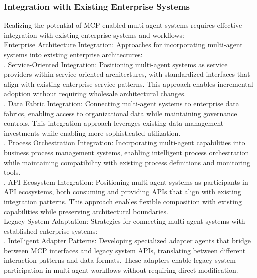 \subsubsection{Integration with Existing Enterprise Systems}
Realizing the potential of MCP-enabled multi-agent systems requires effective integration with existing enterprise systems and workflows:\\ \newline
Enterprise Architecture Integration: Approaches for incorporating multi-agent systems into existing enterprise architectures:\\ . Service-Oriented Integration: Positioning multi-agent systems as service providers within service-oriented architectures, with standardized interfaces that align with existing enterprise service patterns. This approach enables incremental adoption without requiring wholesale architectural changes.\\ . Data Fabric Integration: Connecting multi-agent systems to enterprise data fabrics, enabling access to organizational data while maintaining governance controls. This integration approach leverages existing data management investments while enabling more sophisticated utilization.\\ . Process Orchestration Integration: Incorporating multi-agent capabilities into business process management systems, enabling intelligent process orchestration while maintaining compatibility with existing process definitions and monitoring tools.\\ . API Ecosystem Integration: Positioning multi-agent systems as participants in API ecosystems, both consuming and providing APIs that align with existing integration patterns. This approach enables flexible composition with existing capabilities while preserving architectural boundaries.\\ \newline
Legacy System Adaptation: Strategies for connecting multi-agent systems with established enterprise systems:\\ . Intelligent Adapter Patterns: Developing specialized adapter agents that bridge between MCP interfaces and legacy system APIs, translating between different interaction patterns and data formats. These adapters enable legacy system participation in multi-agent workflows without requiring direct modification.\\ \newline
